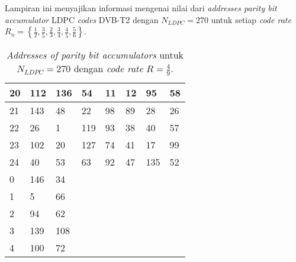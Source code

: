 Lampiran ini menyajikan informasi mengenai nilai dari \textit{addresses parity bit accumulator} LDPC \textit{codes} DVB-T2 dengan $N_{LDPC}=270$ untuk setiap \textit{code rate} $R_n=\left \{\frac{1}{2}, \frac{3}{5}, \frac{2}{3}, \frac{3}{4}, \frac{4}{5}, \frac{5}{6} \right \}$.

\begin{table}[tb]
	\centering
	\caption{\textit{Addresses of parity bit accumulators} untuk $N_{LDPC}=270$ dengan \textit{code rate} $R=\frac{4}{9}$.}
	\label{table:rate2}
\begin{tabular}{|l|l|l|lllll}
	\hline
	20 & 112 & 136 & \multicolumn{1}{l|}{54}  & \multicolumn{1}{l|}{11} & \multicolumn{1}{l|}{12} & \multicolumn{1}{l|}{95}  & \multicolumn{1}{l|}{58} \\ \hline
	21 & 143 & 48  & \multicolumn{1}{l|}{22}  & \multicolumn{1}{l|}{98} & \multicolumn{1}{l|}{89} & \multicolumn{1}{l|}{28}  & \multicolumn{1}{l|}{26} \\ \hline
	22 & 26  & 1   & \multicolumn{1}{l|}{119} & \multicolumn{1}{l|}{93} & \multicolumn{1}{l|}{38} & \multicolumn{1}{l|}{40}  & \multicolumn{1}{l|}{57} \\ \hline
	23 & 102 & 20  & \multicolumn{1}{l|}{127} & \multicolumn{1}{l|}{74} & \multicolumn{1}{l|}{41} & \multicolumn{1}{l|}{17}  & \multicolumn{1}{l|}{99} \\ \hline
	24 & 40  & 53  & \multicolumn{1}{l|}{63}  & \multicolumn{1}{l|}{92} & \multicolumn{1}{l|}{47} & \multicolumn{1}{l|}{135} & \multicolumn{1}{l|}{52} \\ \hline
	0  & 146 & 34  &                          &                         &                         &                          &                         \\ \cline{1-3}
	1  & 5   & 66  &                          &                         &                         &                          &                         \\ \cline{1-3}
	2  & 94  & 62  &                          &                         &                         &                          &                         \\ \cline{1-3}
	3  & 139 & 108 &                          &                         &                         &                          &                         \\ \cline{1-3}
	4  & 100 & 72  &                          &                         &                         &                          &                         \\ \cline{1-3}

\end{tabular}
\end{table}
